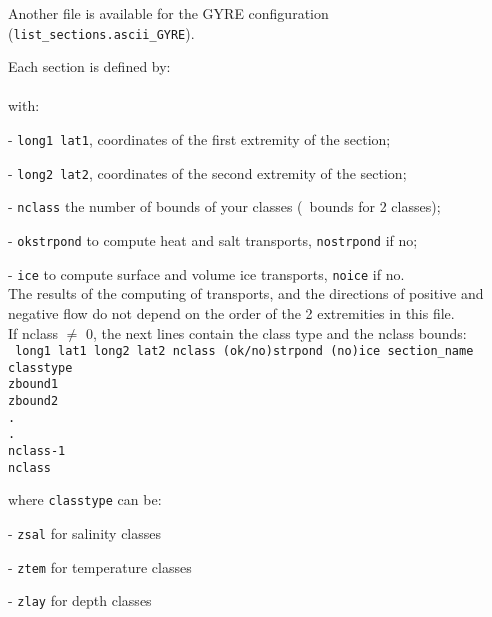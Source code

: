 \documentclass[../main/NEMO_manual]{subfiles}
\begin{document}
Another file is available for the GYRE configuration (\texttt{ {list\_sections.ascii\_GYRE}}).

Each section is defined by: \\
 \\
with:

 - \texttt{long1 lat1}, coordinates of the  first extremity of the section;

 - \texttt{long2 lat2}, coordinates of the second extremity of the section;

 - \texttt{nclass}    the number of bounds of your classes (\eg\ bounds for 2 classes);

 - \texttt{okstrpond} to compute    heat and       salt transports, \texttt{nostrpond} if no;

 - \texttt{ice}       to compute surface and volume ice transports, \texttt{noice}     if no. \\

 \noindent The results of the computing of transports, and the directions of positive and
 negative flow do not depend on the order of the 2 extremities in this file. \\

\noindent If nclass $\neq$ 0, the next lines contain the class type and the nclass bounds: \\
{
  \texttt{
    long1 lat1 long2 lat2 nclass (ok/no)strpond (no)ice section\_name \\
    classtype                                                         \\
    zbound1                                                           \\
    zbound2                                                           \\
    .                                                                 \\
    .                                                                 \\
    nclass-1                                                          \\
    nclass}
}

\noindent where \texttt{classtype} can be:

 - \texttt{zsal}  for          salinity classes

 - \texttt{ztem}  for       temperature classes

 - \texttt{zlay}  for             depth classes
\end{document}
